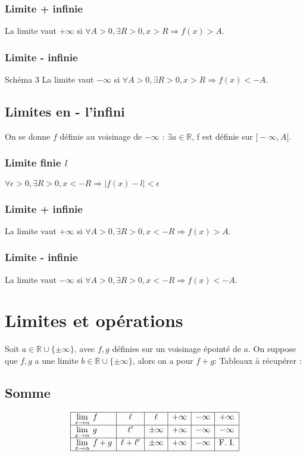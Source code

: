 \documentclass[french]{yLectureNote}
\newcommand{\Lim}[1]{\lim\limits_{\substack{#1}}\:}
\begin{document}
\subsubsection{Limite + infinie}
La limite vaut $+\infty$
si $\forall A>0, \exists R>0, x>R \Rightarrow f(x)>A$.
\subsubsection{Limite - infinie}
Schéma 3
La limite vaut $-\infty$
si $\forall A>0, \exists R>0, x>R \Rightarrow f(x)<-A$.
\subsection{Limites en - l'infini}
On se donne $f$ définie au voisinage de $-\infty$ : $\exists a\in\mathbb{R}$, f est définie sur $]-\infty,A[$.
\subsubsection{Limite finie $l$}
$\forall \epsilon >0, \exists R>0, x<-R \Rightarrow |f(x)-l|<\epsilon$
\subsubsection{Limite + infinie}
La limite vaut $+\infty$
si $\forall A>0, \exists R>0, x<-R \Rightarrow f(x)>A$.
\subsubsection{Limite - infinie}
La limite vaut $-\infty$
si $\forall A>0, \exists R>0, x<-R \Rightarrow f(x)<-A$.
\section{Limites et opérations}
Soit $a\in \mathbb{R}\cup \{\pm \infty\}$, avec $f,g$ définies sur un voisinage épointé de $a$. On suppose que $f,g$ a une limite $b \in\mathbb{R}\cup \{\pm \infty\}$, alors on a pour $f+g$:
Tableaux à récupérer :

\subsection{Somme}
$$\begin{array}{|l|c|c|c|c|c|c|}
\hline
\Lim{x\to \alpha}f & \ell & \ell & +\infty & -\infty & + \infty \\
\hline
\Lim{x\to \alpha}g & \ell' & \pm\infty  & +\infty & -\infty & -\infty \\
\hline
\Lim{x\to \alpha}f+g & \ell + \ell' & \pm\infty  & +\infty & -\infty &  \text{F. I.} \\
\hline
\end{array}$$
\end{document}
